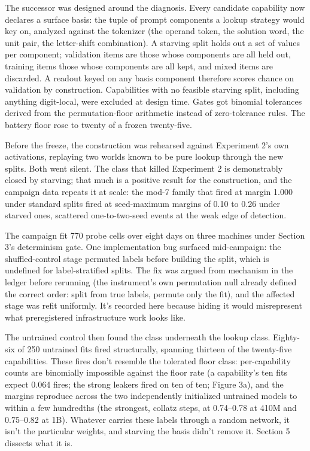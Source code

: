 The successor was designed around the diagnosis. Every candidate
capability now declares a surface basis: the tuple of prompt components a
lookup strategy would key on, analyzed against the tokenizer (the operand
token, the solution word, the unit pair, the letter-shift combination). A
starving split holds out a set of values per component; validation items
are those whose components are all held out, training items those whose
components are all kept, and mixed items are discarded. A readout keyed
on any basis component therefore scores chance on validation by
construction. Capabilities with no feasible starving split, including
anything digit-local, were excluded at design time. Gates got binomial
tolerances derived from the permutation-floor arithmetic instead of
zero-tolerance rules. The battery floor rose to twenty of a frozen
twenty-five.

Before the freeze, the construction was rehearsed against Experiment 2's
own activations, replaying two worlds known to be pure lookup through the
new splits. Both went silent. The class that killed Experiment 2 is
demonstrably closed by starving; that much is a positive result for the
construction, and the campaign data repeats it at scale: the mod-7 family
that fired at margin 1.000 under standard splits fired at seed-maximum
margins of 0.10 to 0.26 under starved ones, scattered one-to-two-seed
events at the weak edge of detection.

The campaign fit 770 probe cells over eight days on three machines
under Section 3's determinism gate. One implementation bug
surfaced mid-campaign: the shuffled-control stage permuted labels before
building the split, which is undefined for label-stratified splits. The
fix was argued from mechanism in the ledger before rerunning (the
instrument's own permutation null already defined the correct order:
split from true labels, permute only the fit), and the affected stage was
refit uniformly. It's recorded here because hiding it would misrepresent
what preregistered infrastructure work looks like.

The untrained control then found the class underneath the lookup class.
Eighty-six of 250 untrained fits fired structurally, spanning thirteen of
the twenty-five capabilities. These fires don't resemble the tolerated
floor class: per-capability counts are binomially impossible against the
floor rate (a capability's ten fits expect 0.064 fires; the strong leakers
fired on ten of ten; Figure 3a), and the margins reproduce across the two
independently initialized untrained models to within a few hundredths
(the strongest, collatz steps, at 0.74--0.78 at 410M and 0.75--0.82 at 1B).
Whatever carries these labels through a random network, it isn't the
particular weights, and starving the basis didn't remove it. Section 5
dissects what it is.

